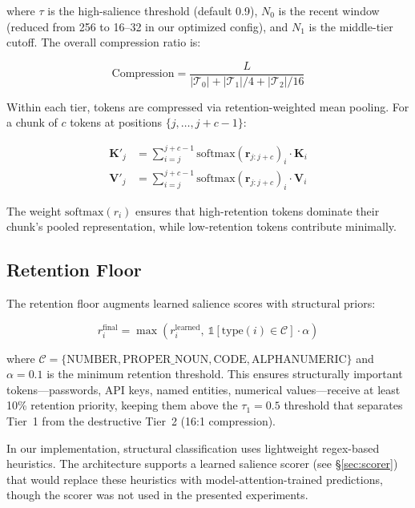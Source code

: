 \documentclass[11pt]{article}
\begin{document}
where $\tau$ is the high-salience threshold (default 0.9), $N_0$ is the recent window (reduced from 256 to 16--32 in our optimized config), and $N_1$ is the middle-tier cutoff. The overall compression ratio is:

\begin{equation}
\text{Compression} = \frac{L}{|\mathcal{T}_0| + |\mathcal{T}_1|/4 + |\mathcal{T}_2|/16}
\end{equation}

Within each tier, tokens are compressed via retention-weighted mean pooling. For a chunk of $c$ tokens at positions $\{j, \ldots, j+c-1\}$:

\begin{align}
\mathbf{K}'_j &= \sum_{i=j}^{j+c-1} \text{softmax}(\mathbf{r}_{j:j+c})_i \cdot \mathbf{K}_i \\
\mathbf{V}'_j &= \sum_{i=j}^{j+c-1} \text{softmax}(\mathbf{r}_{j:j+c})_i \cdot \mathbf{V}_i
\end{align}

The weight $\text{softmax}(r_i)$ ensures that high-retention tokens dominate their chunk's pooled representation, while low-retention tokens contribute minimally.

\subsection{Retention Floor}

The retention floor augments learned salience scores with structural priors:

\begin{equation}
r_i^{\text{final}} = \max\left(r_i^{\text{learned}},\ \mathbb{1}[\text{type}(i) \in \mathcal{C}] \cdot \alpha\right)
\end{equation}

where $\mathcal{C} = \{\text{NUMBER}, \text{PROPER\_NOUN}, \text{CODE}, \text{ALPHANUMERIC}\}$ and $\alpha = 0.1$ is the minimum retention threshold. This ensures structurally important tokens---passwords, API keys, named entities, numerical values---receive at least 10\% retention priority, keeping them above the $\tau_1 = 0.5$ threshold that separates Tier~1 from the destructive Tier~2 (16:1 compression).

In our implementation, structural classification uses lightweight regex-based heuristics. The architecture supports a learned salience scorer (see \S\ref{sec:scorer}) that would replace these heuristics with model-attention-trained predictions, though the scorer was not used in the presented experiments.
\end{document}
